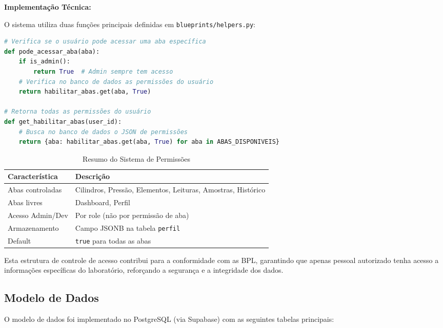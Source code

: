\documentclass[12pt,a4paper]{article}
\begin{document}
\textbf{Implementação Técnica:}

O sistema utiliza duas funções principais definidas em \texttt{blueprints/helpers.py}:

\begin{lstlisting}[language=Python, caption=Funções de Permissão]
# Verifica se o usuário pode acessar uma aba específica
def pode_acessar_aba(aba):
    if is_admin():
        return True  # Admin sempre tem acesso
    # Verifica no banco de dados as permissões do usuário
    return habilitar_abas.get(aba, True)

# Retorna todas as permissões do usuário
def get_habilitar_abas(user_id):
    # Busca no banco de dados o JSON de permissões
    return {aba: habilitar_abas.get(aba, True) for aba in ABAS_DISPONIVEIS}
\end{lstlisting}

\begin{table}[h!]
\centering
\caption{Resumo do Sistema de Permissões}
\label{tab:resumo-permissoes}
\begin{tabular}{@{}ll@{}}
\toprule
\textbf{Característica} & \textbf{Descrição} \\
\midrule
Abas controladas & Cilindros, Pressão, Elementos, Leituras, Amostras, Histórico \\
Abas livres & Dashboard, Perfil \\
Acesso Admin/Dev & Por role (não por permissão de aba) \\
Armazenamento & Campo JSONB na tabela \texttt{perfil} \\
Default & \texttt{true} para todas as abas \\
\bottomrule
\end{tabular}
\end{table}

Esta estrutura de controle de acesso contribui para a conformidade com as BPL, garantindo que apenas pessoal autorizado tenha acesso a informações específicas do laboratório, reforçando a segurança e a integridade dos dados.

\subsection{Modelo de Dados}

O modelo de dados foi implementado no PostgreSQL (via Supabase) com as seguintes tabelas principais:
\end{document}
